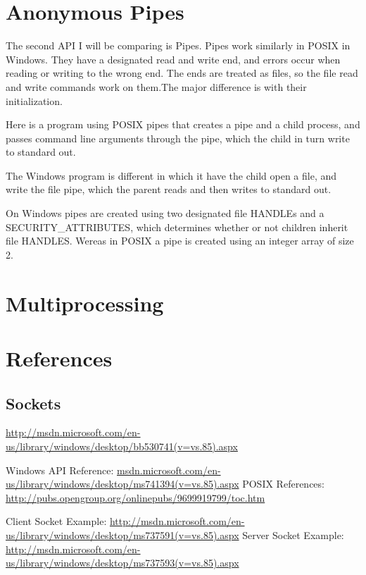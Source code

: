 \documentclass[letterpaper,10pt]{article}
\begin{document}
\section{Anonymous Pipes}

The second API I will be comparing is Pipes. Pipes work similarly in
POSIX in Windows. They have a designated read and write end, and errors
occur when reading or writing to the wrong end. The ends are treated as
files, so the file read and write commands work on them.The major
difference is with their initialization.

Here is a program using POSIX pipes that creates a pipe and a child
process, and passes command line arguments through the pipe, which the
child in turn write to standard out.

The Windows program is different in which it have the child open a
file, and write the file pipe, which the parent reads and then writes to
standard out.




On Windows pipes are created using two designated file HANDLEs and a
SECURITY_ATTRIBUTES, which determines whether or not children inherit
file HANDLES. Wereas in POSIX a pipe is created using an integer array
of size 2.

\section{Multiprocessing}





\newpage

\section{References}

\subsection{Sockets}
\url{http://msdn.microsoft.com/en-us/library/windows/desktop/bb530741(v=vs.85).aspx}

Windows API Reference: \url{msdn.microsoft.com/en-us/library/windows/desktop/ms741394(v=vs.85).aspx}
POSIX References: \url{http://pubs.opengroup.org/onlinepubs/9699919799/toc.htm}

Client Socket Example: \url{http://msdn.microsoft.com/en-us/library/windows/desktop/ms737591(v=vs.85).aspx}
Server Socket Example: \url{http://msdn.microsoft.com/en-us/library/windows/desktop/ms737593(v=vs.85).aspx}
\end{document}
